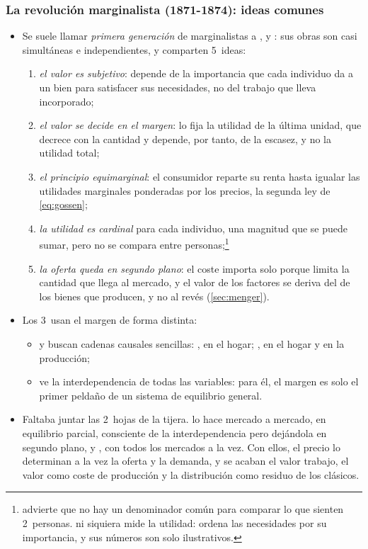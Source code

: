 \documentclass[11pt]{article}
\begin{document}
\subsubsection{La revolución marginalista (1871-1874): ideas comunes}\label{sec:ideas-comunes}

\begin{itemize}
\item Se suele llamar \emph{primera generación} de marginalistas\nocite{LandrethColander2006Historia} a ,  y : sus obras son casi simultáneas e independientes, y comparten 5~ideas:
  \begin{enumerate}
  \item \emph{el valor es subjetivo}: depende de la importancia que cada individuo da a un bien para satisfacer sus necesidades, no del trabajo que lleva incorporado;
  \item \emph{el valor se decide en el margen}: lo fija la utilidad de la última unidad, que decrece con la cantidad y depende, por tanto, de la escasez, y no la utilidad total;
  \item \emph{el principio equimarginal}: el consumidor reparte su renta hasta igualar las utilidades marginales ponderadas por los precios, la segunda ley de  \eqref{eq:gossen};
  \item \emph{la utilidad es cardinal} para cada individuo, una magnitud que se puede sumar, pero no se compara entre personas;\footnote{ advierte que no hay un denominador común para comparar lo que sienten 2~personas\nocite{Jevons1871Theory}.  ni siquiera mide la utilidad: ordena las necesidades por su importancia, y sus números son solo ilustrativos.}
  \item \emph{la oferta queda en segundo plano}: el coste importa solo porque limita la cantidad que llega al mercado, y el valor de los factores se deriva del de los bienes que producen, y no al revés (\ref{sec:menger}).
  \end{enumerate}
\item Los 3~usan el margen de forma distinta:
  \begin{itemize}
  \item {} y  buscan cadenas causales sencillas: , en el hogar; , en el hogar y en la producción;
  \item {} ve la interdependencia de todas las variables: para él, el margen es solo el primer peldaño de un sistema de equilibrio general.
  \end{itemize}
\item Faltaba juntar las 2~hojas de la tijera.  lo hace mercado a mercado, en equilibrio parcial, consciente de la interdependencia pero dejándola en segundo plano, y , con todos los mercados a la vez. Con ellos, el precio lo determinan a la vez la oferta y la demanda, y se acaban el valor trabajo, el valor como coste de producción y la distribución como residuo de los clásicos.
\end{itemize}
\end{document}
